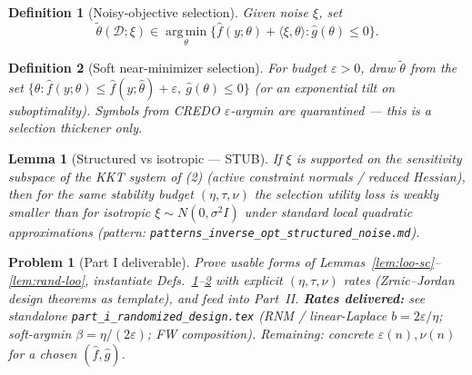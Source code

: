 \documentclass[11pt]{article}
\newtheorem{definition}{Definition}
\newtheorem{lemma}{Lemma}
\newtheorem{problem}{Problem}
\begin{document}
\begin{definition}[Noisy-objective selection]
\label{def:noisy-obj}
Given noise $\xi$, set
\[
\tilde\theta(\mathcal{D};\xi)
\in
\operatorname*{arg\,min}_{\theta}
\bigl\{\hat f(y;\theta)+\langle\xi,\theta\rangle:\hat g(\theta)\le 0\bigr\}.
\]
\end{definition}

\begin{definition}[Soft near-minimizer selection]
\label{def:soft-argmin}
For budget $\varepsilon>0$, draw $\tilde\theta$ from the set
$\{\theta:\hat f(y;\theta)\le\hat f(y;\hat\theta)+\varepsilon,\ \hat g(\theta)\le 0\}$
(or an exponential tilt on suboptimality). Symbols from CREDO $\varepsilon$-argmin are
quarantined --- this is a selection thickener only.
\end{definition}

\begin{lemma}[Structured vs isotropic --- STUB]
\label{lem:structured}
If $\xi$ is supported on the sensitivity subspace of the KKT system of (2)
(active constraint normals / reduced Hessian), then for the same stability budget
$(\eta,\tau,\nu)$ the selection utility loss is weakly smaller than for isotropic
$\xi\sim N(0,\sigma^2 I)$ under standard local quadratic approximations
(pattern: \texttt{patterns\_inverse\_opt\_structured\_noise.md}).
\end{lemma}

\begin{problem}[Part I deliverable]
Prove usable forms of Lemmas~\ref{lem:loo-sc}--\ref{lem:rand-loo},
instantiate Defs.~\ref{def:noisy-obj}--\ref{def:soft-argmin} with explicit
$(\eta,\tau,\nu)$ rates (Zrnic--Jordan design theorems as template), and feed
into Part~II.
\textbf{Rates delivered:} see standalone
\texttt{part\_i\_randomized\_design.tex}
(RNM / linear-Laplace $b=2\varepsilon/\eta$; soft-argmin $\beta=\eta/(2\varepsilon)$;
FW composition). Remaining: concrete $\varepsilon(n),\nu(n)$ for a chosen $(\hat f,\hat g)$.
\end{problem}
\end{document}
